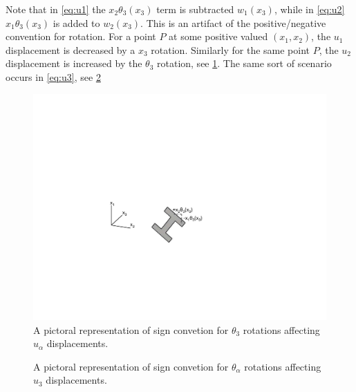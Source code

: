 Note that in \cref{eq:u1} the $x_2\theta_3(x_3)$ term is subtracted $w_1(x_3)$, while in \cref{eq:u2} $x_1\theta_3(x_3)$ is added to $w_2(x_3)$.
This is an artifact of the positive/negative convention for rotation.
For a point $P$ at some positive valued $(x_1,x_2)$, the $u_1$ displacement is decreased by a $x_3$ rotation.
Similarly for the same point $P$, the $u_2$ displacement is increased by the $\theta_3$ rotation, see \cref{fig:u1u2_plus_minus_xtheta}.
The same sort of scenario occurs in \cref{eq:u3}, see \cref{fig:u3_plus_minus_xtheta}

\begin{figure}
\centering
\includegraphics[width=0.45\columnwidth,trim=7cm 7cm 12cm 10cm, clip]{figs/theta_3_influence.pdf}
\caption{A pictoral representation of sign convetion for $\theta_3$ rotations affecting $u_\alpha$ displacements.}
\label{fig:u1u2_plus_minus_xtheta}
\end{figure}

\begin{figure}
\centering
{}
\caption{A pictoral representation of sign convetion for $\theta_\alpha$ rotations affecting $u_3$ displacements.}
\label{fig:u3_plus_minus_xtheta}
\end{figure}

